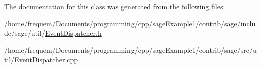 The documentation for this class was generated from the following files\+:\begin{DoxyCompactItemize}
\item 
/home/frequem/\+Documents/programming/cpp/sage\+Example1/contrib/sage/include/sage/util/\mbox{\hyperlink{EventDispatcher_8h}{Event\+Dispatcher.\+h}}\item 
/home/frequem/\+Documents/programming/cpp/sage\+Example1/contrib/sage/src/util/\mbox{\hyperlink{EventDispatcher_8cpp}{Event\+Dispatcher.\+cpp}}\end{DoxyCompactItemize}
